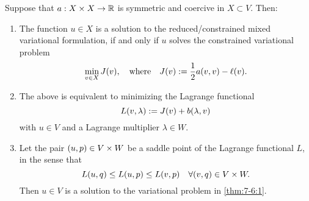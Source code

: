 \begin{theorem}\label{thm:7-6}
	Suppose that \(a: X \times X \to \R\) is symmetric and coercive in \(X \subset V\).
	Then:
	\begin{enumerate}
		\item\label{thm:7-6:1} The function \(u \in X\) is a solution to the reduced/constrained mixed variational formulation, if and only if \(u\) solves the constrained variational problem
		\[
			\min_{v \in X}J\parentheses*{v}, \quad \text{where} \quad J\parentheses*{v} := \frac{1}{2}a\parentheses*{v, v} - \ell\parentheses*{v}.
		\]
		\item\label{thm:7-6:2} The above is equivalent to minimizing the Lagrange functional
		\[
			L\parentheses*{v, \lambda} := J\parentheses*{v} + b\parentheses*{\lambda, v}
		\]
		with \(u \in V\) and a Lagrange multiplier \(\lambda \in W\).
		\item\label{thm:7-6:3} Let the pair \(\parentheses*{u, p} \in V \times W\) be a saddle point of the Lagrange functional \(L\), in the sense that
		\[
			L\parentheses*{u, q} \le L\parentheses*{u, p} \le L\parentheses*{v, p} \quad \forall \parentheses*{v, q} \in V \times W.
		\]
		Then \(u \in V\) is a solution to the variational problem in \ref{thm:7-6:1}.
	\end{enumerate}
\end{theorem}

